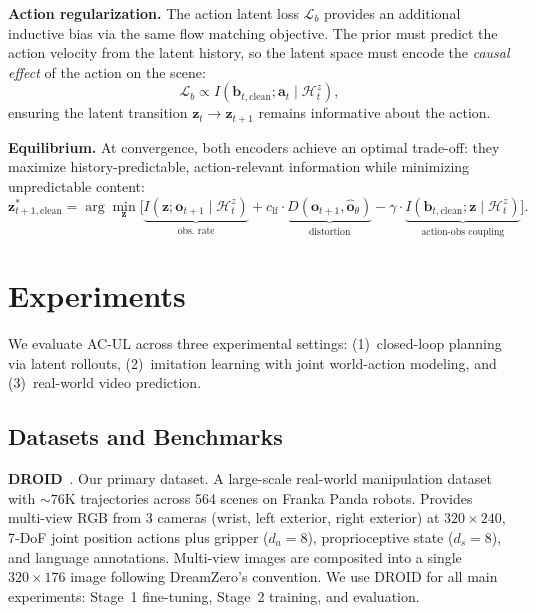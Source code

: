 \documentclass{article}
\newcommand{\vo}{\bm{o}}
\newcommand{\vz}{\bm{z}}
\newcommand{\va}{\bm{a}}
\newcommand{\vb}{\bm{b}}
\newcommand{\loss}{\mathcal{L}}
\begin{document}
\textbf{Action regularization.}
The action latent loss $\loss_b$ provides an additional inductive bias via the same flow matching objective. The prior must predict the action velocity from the latent history, so the latent space must encode the \emph{causal effect} of the action on the scene:
\begin{equation}
  \loss_b \propto I(\vb_{t,\text{clean}}; \va_t \mid \mathcal{H}_t^z),
  \label{eq:action_info}
\end{equation}
ensuring the latent transition $\vz_t \to \vz_{t+1}$ remains informative about the action.

\textbf{Equilibrium.}
At convergence, both encoders achieve an optimal trade-off: they maximize history-predictable, action-relevant information while minimizing unpredictable content:
\begin{equation}
  \vz_{t+1,\text{clean}}^* = \arg\min_{\vz} \Big[\underbrace{I(\vz; \vo_{t+1} \mid \mathcal{H}_t^z)}_{\text{obs.\ rate}} + c_{\text{lf}} \cdot \underbrace{D(\vo_{t+1}, \hat{\vo}_\theta)}_{\text{distortion}} - \gamma \cdot \underbrace{I(\vb_{t,\text{clean}}; \vz \mid \mathcal{H}_t^z)}_{\text{action-obs coupling}}\Big].
  \label{eq:rd_tradeoff}
\end{equation}

\section{Experiments}
\label{sec:experiments}

We evaluate AC-UL across three experimental settings: (1)~closed-loop planning via latent rollouts, (2)~imitation learning with joint world-action modeling, and (3)~real-world video prediction.

\subsection{Datasets and Benchmarks}
\label{sec:datasets}

\textbf{DROID}~\citep{khazatsky2024droid}.
Our primary dataset. A large-scale real-world manipulation dataset with ${\sim}76$K trajectories across 564 scenes on Franka Panda robots. Provides multi-view RGB from 3 cameras (wrist, left exterior, right exterior) at $320 \times 240$, 7-DoF joint position actions plus gripper ($d_a = 8$), proprioceptive state ($d_s = 8$), and language annotations.
Multi-view images are composited into a single $320 \times 176$ image following DreamZero's convention.
We use DROID for all main experiments: Stage~1 fine-tuning, Stage~2 training, and evaluation.
\end{document}
